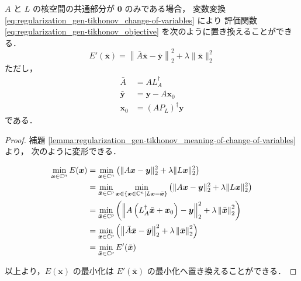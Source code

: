 \begin{theorem}
    $A$ と $L$ の核空間の共通部分が $\bm{0}$ のみである場合，
    変数変換 \eqref{eq:regularization_gen-tikhonov_change-of-variables} により
    評価関数 \eqref{eq:regularization_gen-tikhonov_objective} を次のように置き換えることができる．
    \begin{equation}
        E'(\bar{\bm{x}}) =
        \left\|\bar{A} \bar{\bm{x}} - \bar{\bm{y}}\right\|_2^2
        + \lambda \|\bar{\bm{x}}\|_2^2
    \end{equation}
    ただし，
    \begin{align}
        \bar{A}      & = A L_A^\dagger                     \\
        \bar{\bm{y}} & = \bm{y} - A \bm{x}_0               \\
        \bm{x}_0     & = \left(A P_L\right)^\dagger \bm{y}
    \end{align}
    である．
\end{theorem}
\begin{proof}
    補題 \ref{lemma:regularization_gen-tikhonov_meaning-of-change-of-variables} より，
    次のように変形できる．

    \begin{align}
        \min_{\bm{x}\in\mathbb{C}^n} E(\bm{x})
         & = \min_{\bm{x}\in\mathbb{C}^n} \left( \|A \bm{x} - \bm{y}\|_2^2 + \lambda \|L \bm{x}\|_2^2 \right)
        \notag                                                                                           \\
         & = \min_{\bar{\bm{x}} \in \mathbb{C}^p}
        \min_{\bm{x} \in \{\bm{x} \in \mathbb{C}^n \mid L \bm{x} = \bar{\bm{x}} \}}
        \left( \|A \bm{x} - \bm{y}\|_2^2 + \lambda \|L \bm{x}\|_2^2 \right)
        \notag                                                                                           \\
         & = \min_{\bar{\bm{x}} \in \mathbb{C}^p}
        \left( \left\|A \left(L_A^\dagger \bar{\bm{x}} + \bm{x}_0\right) - \bm{y}\right\|_2^2
        + \lambda \left\|\bar{\bm{x}}\right\|_2^2 \right)
        \notag                                                                                           \\
         & = \min_{\bar{\bm{x}} \in \mathbb{C}^p}
        \left( \left\|\bar{A} \bar{\bm{x}} - \bar{\bm{y}}\right\|_2^2
        + \lambda \left\|\bar{\bm{x}}\right\|_2^2 \right)
        \notag                                                                                           \\
         & = \min_{\bar{\bm{x}} \in \mathbb{C}^p} E'(\bar{\bm{x}})
    \end{align}

    以上より，$E(\bm{x})$ の最小化は $E'(\bar{\bm{x}})$ の最小化へ置き換えることができる．
\end{proof}
